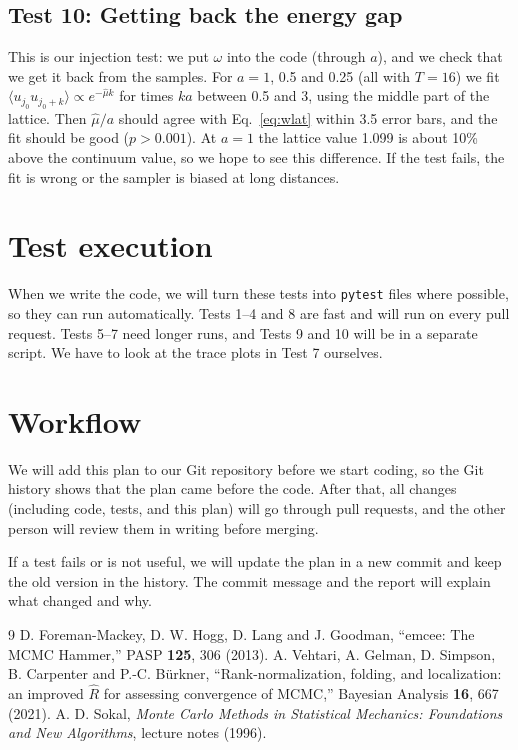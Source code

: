 \documentclass[11pt]{article}
\begin{document}
\subsection*{Test 10: Getting back the energy gap}
This is our injection test: we put $\omega$ into the code (through $a$), and we check that we get it back from the samples. For $a = 1$, 0.5 and 0.25 (all with $T = 16$) we fit $\langle u_{j_0}u_{j_0+k}\rangle \propto e^{-\hat\mu k}$ for times $ka$ between 0.5 and 3, using the middle part of the lattice. Then $\hat\mu/a$ should agree with Eq.~\eqref{eq:wlat} within 3.5 error bars, and the fit should be good ($p > 0.001$). At $a = 1$ the lattice value 1.099 is about 10\% above the continuum value, so we hope to see this difference. If the test fails, the fit is wrong or the sampler is biased at long distances.


\section{Test execution}
When we write the code, we will turn these tests into \texttt{pytest} files where possible, so they can run automatically. Tests 1--4 and 8 are fast and will run on every pull request. Tests 5--7 need longer runs, and Tests 9 and 10 will be in a separate script. We have to look at the trace plots in Test 7 ourselves.



\section{Workflow}
We will add this plan to our Git repository before we start coding, so the Git history shows that the plan came before the code. After that, all changes (including code, tests, and this plan) will go through pull requests, and the other person will review them in writing before merging.

If a test fails or is not useful, we will update the plan in a new commit and keep the old version in the history. The commit message and the report will explain what changed and why. 


\begin{thebibliography}{9}
 D. Foreman-Mackey, D. W. Hogg, D. Lang and J. Goodman, ``emcee: The MCMC Hammer,'' PASP \textbf{125}, 306 (2013).
 A. Vehtari, A. Gelman, D. Simpson, B. Carpenter and P.-C. B\"urkner, ``Rank-normalization, folding, and localization: an improved $\hat R$ for assessing convergence of MCMC,'' Bayesian Analysis \textbf{16}, 667 (2021).
 A. D. Sokal, \emph{Monte Carlo Methods in Statistical Mechanics: Foundations and New Algorithms}, lecture notes (1996).
\end{thebibliography}
\end{document}
